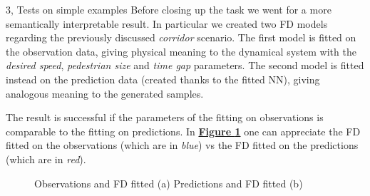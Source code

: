 \documentclass[10pt,a4paper]{article}
\begin{document}
\begin{task}{3, Tests on simple examples}
Before closing up the task we went for a more semantically interpretable result. In particular we created two FD models regarding the previously discussed \textit{corridor} scenario. The first model is fitted on the observation data, giving physical meaning to the dynamical system with the \textit{desired speed}, \textit{pedestrian size} and \textit{time gap} parameters. The second model is fitted instead on the prediction data (created thanks to the fitted NN), giving analogous meaning to the generated samples. 

The result is successful if the parameters of the fitting on observations is comparable to the fitting on predictions. In \textbf{\hyperref[fig:vadere-fd-comp-visual]{Figure \ref{fig:vadere-fd-comp-visual}}} one can appreciate the FD fitted on the observations (which are in \textit{blue}) vs the FD fitted on the predictions (which are in \textit{red}).

\begin{figure}[H]
    \centering
    \hfill
    \caption{Observations and FD fitted (a) Predictions and FD fitted (b)}
    \label{fig:vadere-fd-comp-visual}
\end{figure}


\end{task}
\end{document}
